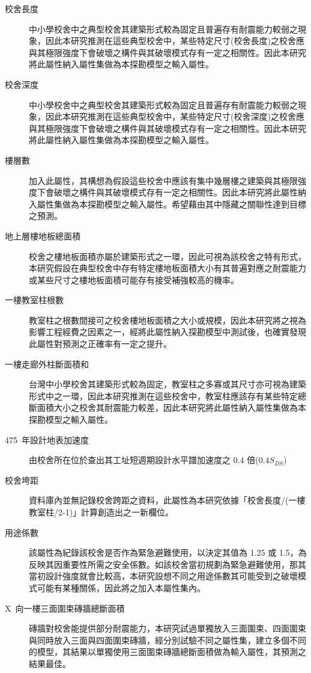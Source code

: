 \begin{description}
  \item[校舍長度]
  中小學校舍中之典型校舍其建築形式較為固定且普遍存有耐震能力較弱之現象，因此本研究推測在這些典型校舍中，某些特定尺寸(校舍長度)之校舍應與其極限強度下會破壞之構件與其破壞模式存有一定之相關性。因此本研究將此屬性納入屬性集做為本探勘模型之輸入屬性。
  \item[校舍深度]
  中小學校舍中之典型校舍其建築形式較為固定且普遍存有耐震能力較弱之現象，因此本研究推測在這些典型校舍中，某些特定尺寸(校舍深度)之校舍應與其極限強度下會破壞之構件與其破壞模式存有一定之相關性。因此本研究將此屬性納入屬性集做為本探勘模型之輸入屬性。
  \item[樓層數]
  加入此屬性，其構想為假設這些校舍中應該有集中幾層樓之建築與其極限強度下會破壞之構件與其破壞模式存有一定之相關性。因此本研究將此屬性納入屬性集做為本探勘模型之輸入屬性。希望藉由其中隱藏之關聯性達到目標之預測。
  \item[地上層樓地板總面積]
  校舍之樓地板面積亦屬於建築形式之一環，因此可視為該校舍之特有形式，本研究假設在典型校舍中存有特定樓地板面積大小有其普遍對應之耐震能力或某些尺寸之樓地板面積可能存有接受補強較高的機率。
  \item[一樓教室柱根數]
  教室柱之根數間接可之校舍樓地板面積之大小或規模，因此本研究將之視為影響工程經費之因素之一，經將此屬性納入探勘模型中測試後，也確實發現此屬性對預測之正確率有一定之提升。
  \item[一樓走廊外柱斷面積和]
  台灣中小學校舍其建築形式較為固定，教室柱之多寡或其尺寸亦可視為建築形式中之一環，因此本研究推測在這些校舍中，教室柱應該存有某些特定總斷面積大小之校舍其耐震能力較差，因此本研究將此屬性納入屬性集做為本探勘模型之輸入屬性。
  \item[475~年設計地表加速度]
  由校舍所在位於查出其工址短週期設計水平譜加速度之 0.4 倍($0.4S_{DS}$)
  \item[校舍垮距]
  資料庫內並無記錄校舍跨距之資料，此屬性為本研究依據「校舍長度/(一樓教室柱/2-1)」計算創造出之一新欄位。
  \item[用途係數]
  該屬性為紀錄該校舍是否作為緊急避難使用，以決定其值為 1.25 或 1.5，為反映其因重要性所需之安全係數。如該校舍當初規劃為緊急避難使用，那其當初設計強度就會比較高，本研究設想不同之用途係數其可能受到之破壞模式可能有某種關係，因此將之加入本屬性集內。
  \item[X~向一樓三面圍束磚牆總斷面積]
  磚牆對校舍能提供部分耐震能力，本研究試過單獨放入三面圍束、四面圍束與同時放入三面與四面圍束磚牆，經分別試驗不同之屬性集，建立多個不同的模型，其結果以單獨使用三面圍束磚牆總斷面積做為輸入屬性，其預測之結果最佳。

\end{description}
